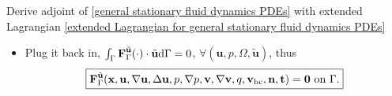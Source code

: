 \documentclass[10pt
hyperref={
    pdfauthor={Hong Quan Ba Nguyen},
    pdftitle={Optimal Shape Design of Air Ducts in Combustion Engines: Design a General Framework},
    pdfsubject={Talk},
    pdfcreator={LaTeX},
}
]{beamer}
\begin{document}
\begin{frame}{Derive adjoint of \eqref{general stationary fluid dynamics PDEs} with extended Lagrangian \eqref{extended Lagrangian for general stationary fluid dynamics PDEs}}
\begin{itemize}
\begin{itemize}
\begin{itemize}
\begin{equation*}
{\begin{split}
                        &= -\partial_{\partial_{x_i}u_j}J_\Gamma(\textbf{x},\textbf{u},\nabla\textbf{u},p,\textbf{n},\textbf{t}),\ \forall i,j = 1,\ldots,N.
                    \end{split}\right.}
                \end{equation*}
                \item {\scriptsize Plug it back in, $\int_\Gamma \textbf{F}_\Gamma^{\tilde{\textbf{u}}}(\cdot)\cdot\tilde{\textbf{u}}{\rm d}\Gamma = 0$, $\forall(\textbf{u},p,\Omega,\tilde{\textbf{u}})$, thus}
                \begin{align*}
                    \boxed{\textbf{F}_\Gamma^{\tilde{\textbf{u}}}(\textbf{x},\textbf{u},\nabla\textbf{u},\Delta\textbf{u},p,\nabla p,\textbf{v},\nabla\textbf{v},q,\textbf{v}_{\rm bc},\textbf{n},\textbf{t}) = \textbf{0} \mbox{ on } \Gamma.}
                \end{align*} 
            \end{itemize}
        \end{itemize}        
    \end{itemize}
\end{frame}
\end{document}
